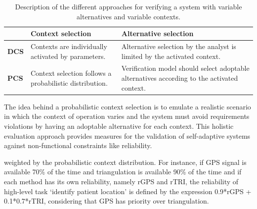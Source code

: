\begin{table}[h]
{\renewcommand{\arraystretch}{2.5}
\begin{tabularx}{\textwidth}{@{}l|XX@{}}
\toprule
			 &                                                         \textbf{Context selection}			 &                                                                                                      \textbf{Alternative selection}			\\ \midrule
\textbf{DCS} & Contexts are individually activated by parameters.  & Alternative selection by the analyst is limited by the activated context.                                                                                    \\
\textbf{PCS} & Context selection follows a probabilistic distribution. & Verification model should select adoptable alternatives according to the activated context.\\ \bottomrule
\end{tabularx}
}
\caption{Description of the different approaches for verifying a system with variable alternatives and variable contexts.}
\label{tab:SC_DCA_PCA}
\end{table}


The idea behind a probabilistic context selection is to emulate a realistic scenario in which the context of operation varies and the system must avoid requirements violations by  having an adoptable alternative for each context. This holistic evaluation approach provides measures for the validation of self-adaptive systems against non-functional constraints like reliability.

weighted by the probabilistic context distribution. For instance, if GPS signal is available 70\% of the time and triangulation is available 90\% of the time and if each method has its own reliability, namely rGPS and rTRI, the reliability of high-level task `identify patient location' is defined by the expression 0.9*rGPS + 0.1*0.7*rTRI, considering that GPS has priority over triangulation. 

